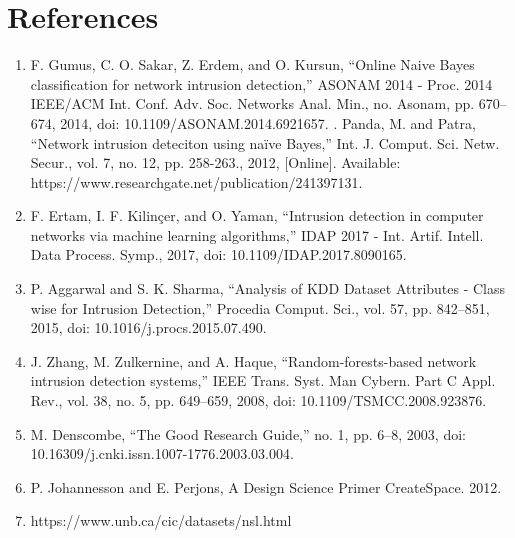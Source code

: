 \documentclass[conference]{IEEEtran}
\begin{document}
\section{References}
\begin{enumerate}
\item F. Gumus, C. O. Sakar, Z. Erdem, and O. Kursun, “Online Naive Bayes classification for network intrusion detection,” ASONAM 2014 - Proc. 2014 IEEE/ACM Int. Conf. Adv. Soc. Networks Anal. Min., no. Asonam, pp. 670–674, 2014, doi: 10.1109/ASONAM.2014.6921657.
\itemM. Panda, M. and Patra, “Network intrusion deteciton using naïve Bayes,” Int. J. Comput. Sci. Netw. Secur., vol. 7, no. 12, pp. 258-263., 2012, [Online]. Available: https://www.researchgate.net/publication/241397131.


\item 	F. Ertam, I. F. Kilinçer, and O. Yaman, “Intrusion detection in computer networks via machine learning algorithms,” IDAP 2017 - Int. Artif. Intell. Data Process. Symp., 2017, doi: 10.1109/IDAP.2017.8090165.

\item 	P. Aggarwal and S. K. Sharma, “Analysis of KDD Dataset Attributes - Class wise for Intrusion Detection,” Procedia Comput. Sci., vol. 57, pp. 842–851, 2015, doi: 10.1016/j.procs.2015.07.490.


\item J. Zhang, M. Zulkernine, and A. Haque, “Random-forests-based network intrusion detection systems,” IEEE Trans. Syst. Man Cybern. Part C Appl. Rev., vol. 38, no. 5, pp. 649–659, 2008, doi: 10.1109/TSMCC.2008.923876.

\item M. Denscombe, “The Good Research Guide,” no. 1, pp. 6–8, 2003, doi: 10.16309/j.cnki.issn.1007-1776.2003.03.004.

\item P. Johannesson and E. Perjons, A Design Science Primer CreateSpace. 2012.

\item https://www.unb.ca/cic/datasets/nsl.html

\end{enumerate}
\end{document}
